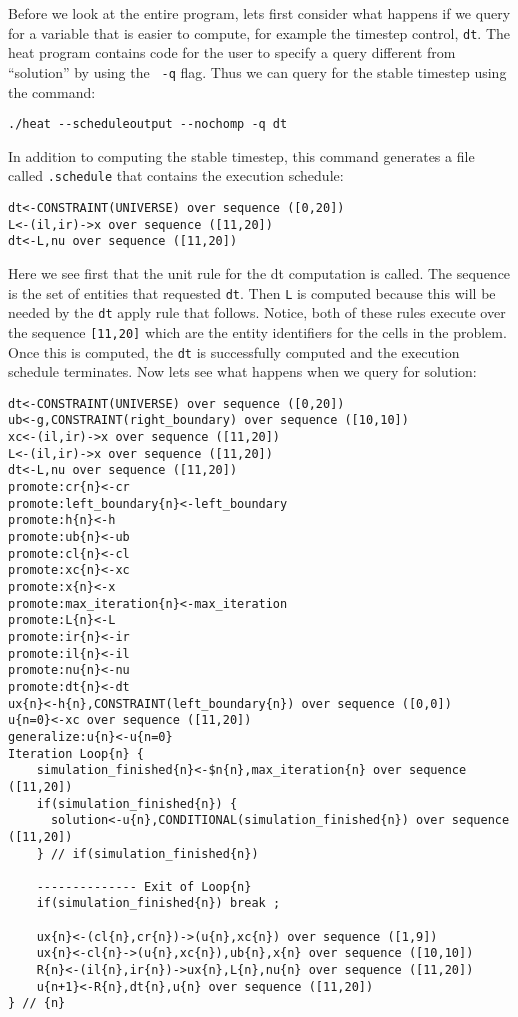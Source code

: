 \documentclass[10pt,epsf]{book}
\begin{document}
Before we look at the entire program, lets first consider what happens
if we query for a variable that is easier to compute, for example the
timestep control, {\tt dt}.  The heat program contains code for the
user to specify a query different from ``solution'' by using the {\tt
  -q} flag.  Thus we can query for the stable timestep using the
command:
\begin{verbatim}
./heat --scheduleoutput --nochomp -q dt
\end{verbatim}

In addition to computing the stable timestep, this command generates a
file called {\tt .schedule} that contains the execution schedule:
\begin{verbatim}
dt<-CONSTRAINT(UNIVERSE) over sequence ([0,20])
L<-(il,ir)->x over sequence ([11,20])
dt<-L,nu over sequence ([11,20])
\end{verbatim}

Here we see first that the unit rule for the dt computation is
called.  The sequence is the set of entities that requested {\tt dt}.
Then {\tt L} is computed because this will be needed by the {\tt dt}
apply rule that follows.  Notice, both of these rules execute over the
sequence {\tt [11,20]} which are the entity identifiers for the
cells in the problem.  Once this is computed, the {\tt dt} is
successfully computed and the execution schedule terminates.  Now lets
see what happens when we query for solution:

\begin{verbatim}
dt<-CONSTRAINT(UNIVERSE) over sequence ([0,20])
ub<-g,CONSTRAINT(right_boundary) over sequence ([10,10])
xc<-(il,ir)->x over sequence ([11,20])
L<-(il,ir)->x over sequence ([11,20])
dt<-L,nu over sequence ([11,20])
promote:cr{n}<-cr
promote:left_boundary{n}<-left_boundary
promote:h{n}<-h
promote:ub{n}<-ub
promote:cl{n}<-cl
promote:xc{n}<-xc
promote:x{n}<-x
promote:max_iteration{n}<-max_iteration
promote:L{n}<-L
promote:ir{n}<-ir
promote:il{n}<-il
promote:nu{n}<-nu
promote:dt{n}<-dt
ux{n}<-h{n},CONSTRAINT(left_boundary{n}) over sequence ([0,0])
u{n=0}<-xc over sequence ([11,20])
generalize:u{n}<-u{n=0}
Iteration Loop{n} {
    simulation_finished{n}<-$n{n},max_iteration{n} over sequence ([11,20])
    if(simulation_finished{n}) {
      solution<-u{n},CONDITIONAL(simulation_finished{n}) over sequence ([11,20])
    } // if(simulation_finished{n})

    -------------- Exit of Loop{n}
    if(simulation_finished{n}) break ;

    ux{n}<-(cl{n},cr{n})->(u{n},xc{n}) over sequence ([1,9])
    ux{n}<-cl{n}->(u{n},xc{n}),ub{n},x{n} over sequence ([10,10])
    R{n}<-(il{n},ir{n})->ux{n},L{n},nu{n} over sequence ([11,20])
    u{n+1}<-R{n},dt{n},u{n} over sequence ([11,20])
} // {n}
\end{verbatim}
\end{document}

